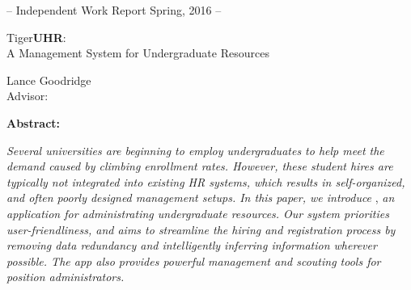 \documentclass[../report.tex]{subfiles}
\begin{document}
\begin{center}
    \small{-- Independent Work Report Spring, 2016 --}
\end{center}

\vspace{1in}

\begin{center}
    \huge{Tiger\textbf{UHR}:} \\
    \vspace{0.1in}
    \large{A Management System for Undergraduate Resources}
\end{center}

\vspace{1in}

\begin{center}
    \Large{Lance Goodridge} \\
    \vspace{0.1in}
    \large{Advisor: \advisor} \\
\end{center}

\vspace{1in}

\begin{center}
    \textbf{Abstract:}
\end{center}
\textit{Several universities are beginning to employ undergraduates to help meet the demand caused by climbing enrollment rates. However, these student hires are typically not integrated into existing HR systems, which results in self-organized, and often poorly designed management setups. In this paper, we introduce} \tigeruhr{}, \textit{an application for administrating undergraduate resources. Our system priorities user-friendliness, and aims to streamline the hiring and registration process by removing data redundancy and intelligently inferring information wherever possible. The app also provides powerful management and scouting tools for position administrators.}

\thispagestyle{empty}

\newpage
\tableofcontents
\newpage
\end{document}
